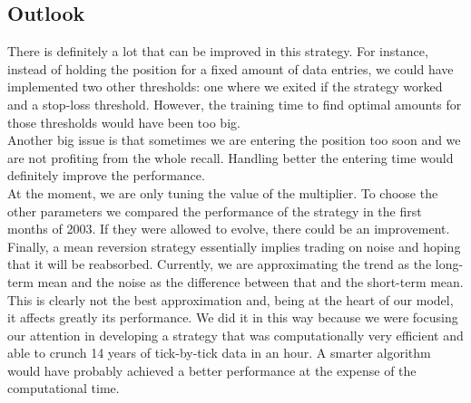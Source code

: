 \documentclass[a4paper]{article}
\begin{document}
\subsection{Outlook}

There is definitely a lot that can be improved in this strategy. For instance, instead of holding the position for a fixed amount of data entries, we could have implemented two other thresholds: one where we exited if the strategy worked and a stop-loss threshold. However, the training time to find optimal amounts for those thresholds would have been too big.\\
Another big issue is that sometimes we are entering the position too soon and we are not profiting from the whole recall. Handling better the entering time would definitely improve the performance.\\
At the moment, we are only tuning the value of the multiplier. To choose the other parameters we compared the performance of the strategy in the first months of 2003. If they were allowed to evolve, there could be an improvement.\\
Finally, a mean reversion strategy essentially implies trading on noise and hoping that it will be reabsorbed. Currently, we are approximating the trend as the long-term mean and the noise as the difference between that and the short-term mean. This is clearly not the best approximation and, being at the heart of our model, it affects greatly its performance. We did it in this way because we were focusing our attention in developing a strategy that was computationally very efficient and able to crunch 14 years of tick-by-tick data in an hour. A smarter algorithm would have probably achieved a better performance at the expense of the computational time.
\end{document}
